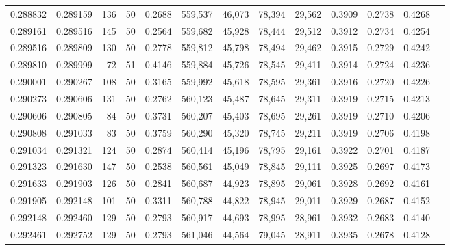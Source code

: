 \begin{tabular}{rrrrrrrrrrrrr}
0.288832 & 0.289159 &   136 &  50 &                                     0.2688 & 559,537 &  46,073 &  78,394 &  29,562 & 0.3909 & 0.2738 & 0.4268 \\
0.289161 & 0.289516 &   145 &  50 &                                     0.2564 & 559,682 &  45,928 &  78,444 &  29,512 & 0.3912 & 0.2734 & 0.4254 \\
0.289516 & 0.289809 &   130 &  50 &                                     0.2778 & 559,812 &  45,798 &  78,494 &  29,462 & 0.3915 & 0.2729 & 0.4242 \\
0.289810 & 0.289999 &    72 &  51 &                                     0.4146 & 559,884 &  45,726 &  78,545 &  29,411 & 0.3914 & 0.2724 & 0.4236 \\
0.290001 & 0.290267 &   108 &  50 &                                     0.3165 & 559,992 &  45,618 &  78,595 &  29,361 & 0.3916 & 0.2720 & 0.4226 \\
0.290273 & 0.290606 &   131 &  50 &                                     0.2762 & 560,123 &  45,487 &  78,645 &  29,311 & 0.3919 & 0.2715 & 0.4213 \\
0.290606 & 0.290805 &    84 &  50 &                                     0.3731 & 560,207 &  45,403 &  78,695 &  29,261 & 0.3919 & 0.2710 & 0.4206 \\
0.290808 & 0.291033 &    83 &  50 &                                     0.3759 & 560,290 &  45,320 &  78,745 &  29,211 & 0.3919 & 0.2706 & 0.4198 \\
0.291034 & 0.291321 &   124 &  50 &                                     0.2874 & 560,414 &  45,196 &  78,795 &  29,161 & 0.3922 & 0.2701 & 0.4187 \\
0.291323 & 0.291630 &   147 &  50 &                                     0.2538 & 560,561 &  45,049 &  78,845 &  29,111 & 0.3925 & 0.2697 & 0.4173 \\
0.291633 & 0.291903 &   126 &  50 &                                     0.2841 & 560,687 &  44,923 &  78,895 &  29,061 & 0.3928 & 0.2692 & 0.4161 \\
0.291905 & 0.292148 &   101 &  50 &                                     0.3311 & 560,788 &  44,822 &  78,945 &  29,011 & 0.3929 & 0.2687 & 0.4152 \\
0.292148 & 0.292460 &   129 &  50 &                                     0.2793 & 560,917 &  44,693 &  78,995 &  28,961 & 0.3932 & 0.2683 & 0.4140 \\
0.292461 & 0.292752 &   129 &  50 &                                     0.2793 & 561,046 &  44,564 &  79,045 &  28,911 & 0.3935 & 0.2678 & 0.4128 \\

\end{tabular}
